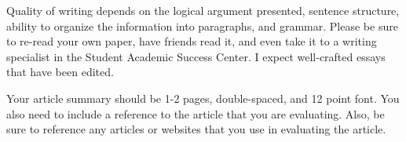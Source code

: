 \documentclass[11pt,]{article}
\begin{document}
Quality of writing depends on the logical argument presented, sentence
structure, ability to organize the information into paragraphs, and
grammar. Please be sure to re-read your own paper, have friends read it,
and even take it to a writing specialist in the Student Academic Success
Center. I expect well-crafted essays that have been edited.

Your article summary should be 1-2 pages, double-spaced, and 12 point
font. You also need to include a reference to the article that you are
evaluating. Also, be sure to reference any articles or websites that you
use in evaluating the article.
\end{document}
